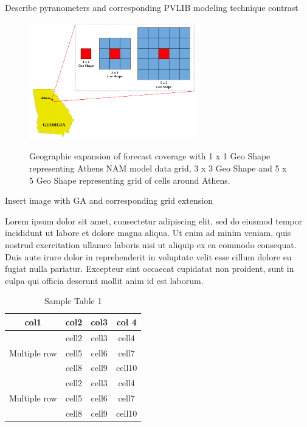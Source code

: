 

\par Describe pyranometers and corresponding PVLIB modeling technique contrast



\begin{figure}[htbp]
    \begin{center}
    	\includegraphics[width=0.65\textwidth]{chapter3/fig_geoshapes.png}
    	\label{fig:fig_geoshapes}
    	\caption[Geographic expansion of forecast coverage around Athens NAM model data grid]{Geographic expansion of forecast coverage with 1 x 1 Geo Shape representing Athens NAM model data grid, 3 x 3 Geo Shape and 5 x 5 Geo Shape representing grid of cells around Athens.}
    \end{center}
\end{figure}


\par Insert image with GA and corresponding grid extension



Lorem ipsum dolor sit amet, consectetur adipiscing elit, sed do eiusmod tempor incididunt ut labore et dolore magna aliqua. Ut enim ad minim veniam, quis nostrud exercitation ullamco laboris nisi ut aliquip ex ea commodo consequat. Duis aute irure dolor in reprehenderit in voluptate velit esse cillum dolore eu fugiat nulla pariatur. Excepteur sint occaecat cupidatat non proident, sunt in culpa qui officia deserunt mollit anim id est laborum.

\begin{table}[h]
\begin{center}
    \caption{Sample Table 1}
    \begin{tabular}{ c c c c }
    	\toprule
    	col1 & col2 & col3 & col 4 \\
    	\midrule
    	\multirow{3}{4em}{Multiple row} & cell2 & cell3 & cell4\\ &
    	cell5 & cell6 & cell7 \\ &
    	cell8 & cell9 & cell10 \\
    	\midrule
    	\multirow{3}{4em}{Multiple row} & cell2 & cell3 & cell4 \\ &
    	cell5 & cell6 & cell7 \\ &
    	cell8 & cell9 & cell10 \\
    	\bottomrule
    \end{tabular}
\end{center}
\end{table}


